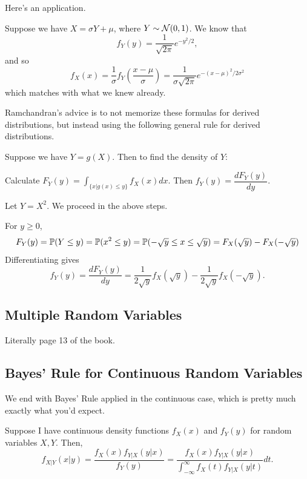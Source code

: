\documentclass[11 pt]{scrartcl}
\begin{document}

Here's an application. 
\begin{example}
    Suppose we have $X = \sigma Y + \mu$, where $Y\sim\mathcal{N}(0,1)$. We know that 
    \[ f_Y(y) = \dfrac{1}{\sqrt{2\pi}} e^{-y^2/2},\] 
    and so 
    \[ f_X(x) = \dfrac{1}{\sigma} f_Y\left(\dfrac{x-\mu}{\sigma}\right) = \dfrac{1}{\sigma\sqrt{2\pi}}e^{-(x-\mu)^2/2\sigma^2} \] 
    which matches with what we knew already. 
\end{example}

Ramchandran's advice is to not memorize these formulas for derived distributions, but instead using the following general rule for derived distributions. 

\begin{theorem}
    Suppose we have $Y = g(X)$. Then to find the density of $Y$:  
    \begin{enumerate}
        \ii Calculate $F_Y(y) = \int_{\{x | g(x) \leq y\}} f_X(x) dx$. 
        \ii Then $f_Y(y) = \dfrac{dF_Y(y)}{dy}.$ 
    \end{enumerate}
\end{theorem}

\begin{example}
    Let $Y = X^2$. We proceed in the above steps. 
    \begin{enumerate}
        \ii For $y\geq 0$, 
        \[ F_Y(y) = \mathbb P(Y\leq y) = \mathbb P(x^2 \leq y) = \mathbb P(-\sqrt{y}\leq x \leq \sqrt{y}) = F_X(\sqrt{y}) - F_X(-\sqrt{y}) \]
        \ii Differentiating gives 
        \[ f_Y(y) = \dfrac{dF_Y(y)}{dy} = \dfrac{1}{2\sqrt{y}}f_X(\sqrt{y}) - \dfrac{1}{2\sqrt{y}}f_X(-\sqrt{y}).\] 
    \end{enumerate}
\end{example}

\subsection{Multiple Random Variables}
Literally page 13 of the book. 

\subsection{Bayes' Rule for Continuous Random Variables}
We end with Bayes' Rule applied in the continuous case, which is pretty much exactly what you'd expect.
\begin{theorem}
    Suppose I have continuous density functions $f_X(x)$ and $f_Y(y)$ for random variables $X,Y$. Then, 
    \[ f_{X|Y}(x|y) = \dfrac{f_X(x)f_{Y|X}(y|x)}{f_Y(y)} = \dfrac{f_X(x)f_{Y|X}(y|x)}{\int_{-\infty}^\infty f_X(t)f_{Y|X}(y|t)} dt.\]
\end{theorem}
\end{document}
